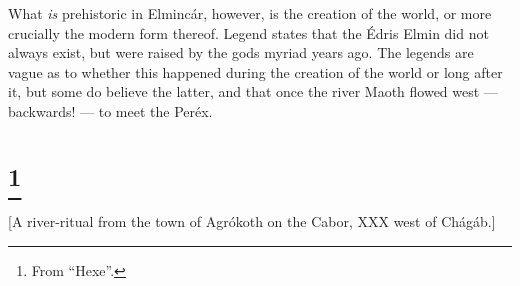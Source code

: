 \documentclass{article}
\let\oldthefootnote\thefootnote
\newcommand\oocfootnote[2][DarkGreen]{\renewcommand\thefootnote{\color{#1}\oldthefootnote}%
  \footnote{\color{#1}#2}%
  \renewcommand{\thefootnote}{\oldthefootnote}}
\begin{document}
What \emph{is} prehistoric in Elmincár, however, is the creation of the world, or more crucially the modern form thereof. Legend states that the Édris Elmin did not always exist, but were raised by the gods myriad years ago. The legends are vague as to whether this happened during the creation of the world or long after it, but some do believe the latter, and that once the river Maoth flowed west — backwards! — to meet the Peréx.

\color{black}

\section{\oocfootnote{From ``Hexe''.}}

[A river-ritual from the town of Agrókoth on the Cabor, XXX west of Chágáb.]
\end{document}
